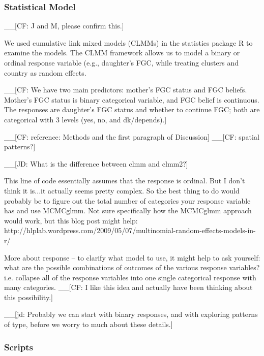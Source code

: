 \documentclass[12pt,]{article}
\begin{document}

\subsubsection{Statistical Model}\label{statistical-model}

\_\_{[}CF: J and M, please confirm this.{]} 

We used cumulative link mixed models (CLMMs) in the statistics package R \cite{Rstats,Rpackage_ordinal} to examine the models.  The CLMM framework allows us to model a binary or ordinal response variable (e.g., daughter's FGC, while treating clusters and country as random effects.

\_\_{[}CF: We have two main predictors:  mother's FGC status and FGC beliefs.  Mother's FGC status is binary categorical variable, and FGC belief is continuous.  The responses are daughter's FGC status and whether to continue FGC; both are categorical with 3 levels (yes, no, and dk/depends).{]} 

\_\_{[}CF: reference: Methods and the first paragraph of Discussion\cite{Chia14}{]}
\_\_{[}CF: spatial patterns?{]}

\_\_{[}JD: What is the difference between clmm and clmm2?{]}

This line of code essentially assumes that the response is ordinal. But I don't think it is...it actually seems pretty complex. So the best thing to do would probably be to figure out the total number of categories your response variable has and use MCMCglmm. Not sure specifically how the MCMCglmm approach would work, but this blog post might help: http://hlplab.wordpress.com/2009/05/07/multinomial-random-effects-models-in-r/

More about response -- to clarify what model to use, it might help to ask yourself: what are the possible combinations of outcomes of the various response variables?  i.e. collapse all of the response variables into one single categorical response with many categories. \_\_{[}CF: I like this idea and actually have been thinking about this possibility.{]}

\_\_{[}jd: Probably we can start with binary responses, and with exploring patterns of type, before we worry to much about these details.{]}

\subsubsection{Scripts}\label{scripts}
\end{document}
